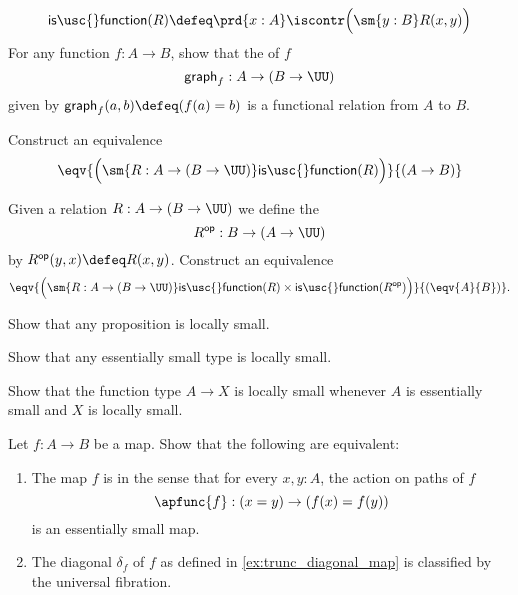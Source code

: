\begin{exercises}
\begin{subexenum}
\begin{equation*}
\mathsf{is\usc{}function}(R) \defeq \prd{x:A}\iscontr\Big(\sm{y:B}R(x,y)\Big)
\end{equation*}
For any function $f:A\to B$, show that the  of $f$ 
\begin{equation*}
\mathsf{graph}_f:A\to (B\to \UU)
\end{equation*}
given by $\mathsf{graph}_f(a,b)\defeq (f(a)=b)$ is a functional relation from $A$ to $B$.
\item Construct an equivalence
\begin{equation*}
\eqv{\Big(\sm{R:A\to (B\to\UU)}\mathsf{is\usc{}function}(R)\Big)}{(A\to B)}
\end{equation*}
\item Given a relation $R:A\to (B\to \UU)$ we define the 
\begin{equation*}
R^{\mathsf{op}} : B\to (A\to\UU)
\end{equation*}
by $R^{\mathsf{op}}(y,x)\defeq R(x,y)$. Construct an equivalence
\begin{equation*}
\eqv{\Big(\sm{R:A\to (B\to \UU)}\mathsf{is\usc{}function}(R)\times\mathsf{is\usc{}function}(R^{\mathsf{op}})\Big)}{(\eqv{A}{B})}.
\end{equation*}
\end{subexenum}
\item
\begin{subexenum}
\item Show that any proposition is locally small.
\item Show that any essentially small type is locally small.
\item Show that the function type $A\to X$ is locally small whenever $A$ is essentially small and $X$ is locally small.
\end{subexenum}
\item Let $f:A\to B$ be a map. Show that the following are equivalent:
\begin{enumerate}
\item The map $f$ is  in the sense that for every $x,y:A$, the action on paths of $f$
\begin{equation*}
\apfunc{f}:(x=y)\to (f(x)=f(y))
\end{equation*}
is an essentially small map.
\item The diagonal $\delta_f$ of $f$ as defined in \cref{ex:trunc_diagonal_map} is classified by the universal fibration.
\end{enumerate}
\end{exercises}
